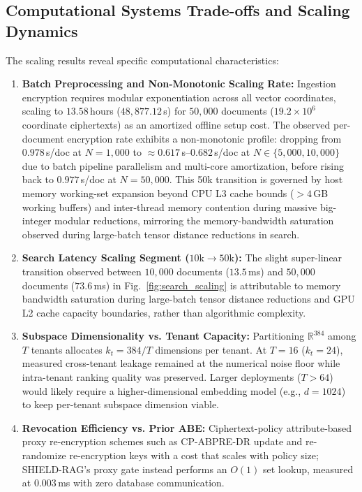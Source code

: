 \documentclass[10pt,a4paper]{article}
\begin{document}
\subsection{Computational Systems Trade-offs and Scaling Dynamics}
The scaling results reveal specific computational characteristics:
\begin{enumerate}
    \item \textbf{Batch Preprocessing and Non-Monotonic Scaling Rate:} Ingestion encryption requires modular exponentiation across all vector coordinates, scaling to $13.58$\,hours ($48{,}877.12$\,s) for $50{,}000$ documents ($19.2 \times 10^6$ coordinate ciphertexts) as an amortized offline setup cost. The observed per-document encryption rate exhibits a non-monotonic profile: dropping from $0.978$\,s/doc at $N=1{,}000$ to $\approx 0.617$\,s--$0.682$\,s/doc at $N \in \{5{,}000, 10{,}000\}$ due to batch pipeline parallelism and multi-core amortization, before rising back to $0.977$\,s/doc at $N=50{,}000$. This 50k transition is governed by host memory working-set expansion beyond CPU L3 cache bounds ($>4$\,GB working buffers) and inter-thread memory contention during massive big-integer modular reductions, mirroring the memory-bandwidth saturation observed during large-batch tensor distance reductions in search.
    \item \textbf{Search Latency Scaling Segment ($10\text{k} \to 50\text{k}$):} The slight super-linear transition observed between $10{,}000$ documents ($13.5$\,ms) and $50{,}000$ documents ($73.6$\,ms) in Fig.~\ref{fig:search_scaling} is attributable to memory bandwidth saturation during large-batch tensor distance reductions and GPU L2 cache capacity boundaries, rather than algorithmic complexity.
    \item \textbf{Subspace Dimensionality vs. Tenant Capacity:} Partitioning $\mathbb{R}^{384}$ among $T$ tenants allocates $k_t = 384/T$ dimensions per tenant. At $T=16$ ($k_t=24$), measured cross-tenant leakage remained at the numerical noise floor while intra-tenant ranking quality was preserved. Larger deployments ($T > 64$) would likely require a higher-dimensional embedding model (e.g., $d=1024$) to keep per-tenant subspace dimension viable.
    \item \textbf{Revocation Efficiency vs. Prior ABE:} Ciphertext-policy attribute-based proxy re-encryption schemes such as CP-ABPRE-DR \cite{ge2024attributebased} update and re-randomize re-encryption keys with a cost that scales with policy size; SHIELD-RAG's proxy gate instead performs an $O(1)$ set lookup, measured at $0.003$\,ms with zero database communication.
\end{enumerate}
\end{document}

